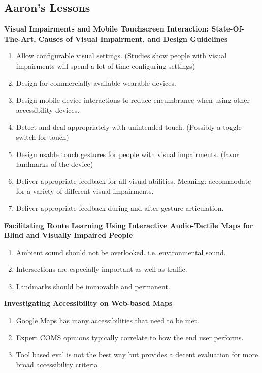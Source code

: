 \documentclass{article}
\begin{document}
\subsection{Aaron's Lessons}
\cite{} \textbf{Visual Impairments and Mobile Touchscreen Interaction: State-Of-The-Art, Causes of Visual Impairment, and Design Guidelines} \cite{}
\begin{enumerate}
    \item Allow configurable visual settings. (Studies show people with visual impairments will spend a lot of time configuring settings) 
    \item Design for commercially available wearable devices. 
    \item Design mobile device interactions to reduce encumbrance when using other accessibility devices.
    \item Detect and deal appropriately with unintended touch. (Possibly a toggle switch for touch) 
    \item Design usable touch gestures for people with visual impairments. (favor landmarks of the device)
    \item Deliver appropriate feedback for all visual abilities. Meaning: accommodate for a variety of different visual impairments.
    \item Deliver appropriate feedback during and after gesture articulation.
\end{enumerate}

\cite{} \textbf{Facilitating Route Learning Using Interactive Audio-Tactile Maps for Blind and Visually Impaired People } \cite{}

\begin{enumerate}
    \item Ambient sound should not be overlooked. i.e. environmental sound.
    \item Intersections are especially important as well as traffic. 
    \item Landmarks should be immovable and permanent. 
\end{enumerate}

\cite{} \textbf{Investigating Accessibility on Web-based Maps } \cite{}

\begin{enumerate}
    \item Google Maps has many accessibilities that need to be met. 
    \item Expert COMS opinions typically correlate to how the end user performs. 
    \item Tool based eval is not the best way but provides a decent evaluation for more broad accessibility criteria. 
\end{enumerate}
\end{document}
